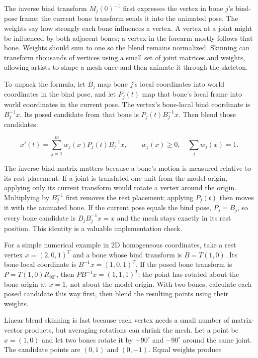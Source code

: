 The inverse bind transform \(M_j(0)^{-1}\) first expresses the vertex in bone \(j\)'s bind-pose frame; the current bone transform sends it into the animated pose. The weights say how strongly each bone influences a vertex. A vertex at a joint might be influenced by both adjacent bones; a vertex in the forearm mostly follows that bone. Weights should sum to one so the blend remains normalized. Skinning can transform thousands of vertices using a small set of joint matrices and weights, allowing artists to shape a mesh once and then animate it through the skeleton.

To unpack the formula, let \(B_j\) map bone \(j\)'s local coordinates into world coordinates in the bind pose, and let \(P_j(t)\) map that bone's local frame into world coordinates in the current pose. The vertex's bone-local bind coordinate is \(B_j^{-1}x\). Its posed candidate from that bone is \(P_j(t)B_j^{-1}x\). Then blend those candidates:

\[
x'(t)=\sum_{j=1}^{m}w_j(x)P_j(t)B_j^{-1}x,\qquad
w_j(x)\ge0,\quad\sum_jw_j(x)=1.
\]

The inverse bind matrix matters because a bone's motion is measured relative to its rest placement. If a joint is translated one unit from the model origin, applying only its current transform would rotate a vertex around the origin. Multiplying by \(B_j^{-1}\) first removes the rest placement; applying \(P_j(t)\) then moves it with the animated bone. If the current pose equals the bind pose, \(P_j=B_j\), so every bone candidate is \(B_jB_j^{-1}x=x\) and the mesh stays exactly in its rest position. This identity is a valuable implementation check.

For a simple numerical example in 2D homogeneous coordinates, take a rest vertex \(x=(2,0,1)^T\) and a bone whose bind transform is \(B=T(1,0)\). Its bone-local coordinate is \(B^{-1}x=(1,0,1)^T\). If the posed bone transform is \(P=T(1,0)R_{90^\circ}\), then \(PB^{-1}x=(1,1,1)^T\): the point has rotated about the bone origin at \(x=1\), not about the model origin. With two bones, calculate each posed candidate this way first, then blend the resulting points using their weights.

Linear blend skinning is fast because each vertex needs a small number of matrix-vector products, but averaging rotations can shrink the mesh. Let a point be \(x=(1,0)\) and let two bones rotate it by \(+90^\circ\) and \(-90^\circ\) around the same joint. The candidate points are \((0,1)\) and \((0,-1)\). Equal weights produce

